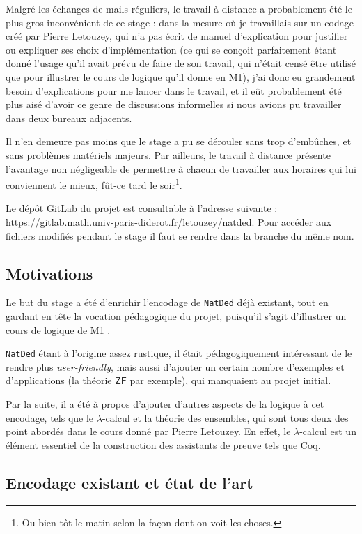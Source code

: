 \documentclass[a4paper]{article}
\newcommand{\ZF}{\mathsf{ZF}}
\theoremstyle{remark}
\theoremstyle{remark}
\theoremstyle{remark}
\theoremstyle{definition}
\theoremstyle{definition}
\theoremstyle{definition}
\begin{document}
Malgré les échanges de mails réguliers, le travail à distance a probablement été le plus gros inconvénient de ce stage : dans la mesure où je travaillais sur un codage créé par Pierre Letouzey, qui n'a pas écrit de manuel d'explication pour justifier ou expliquer ses choix d'implémentation (ce qui se conçoit parfaitement étant donné l'usage qu'il avait prévu de faire de son travail, qui n'était censé être utilisé que pour illustrer le cours de logique qu'il donne en M1), j'ai donc eu grandement besoin d'explications pour me lancer dans le travail, et il eût probablement été plus aisé d'avoir ce genre de discussions informelles si nous avions pu travailler dans deux bureaux adjacents.

Il n'en demeure pas moins que le stage a pu se dérouler sans trop d'embûches, et sans problèmes matériels majeurs. Par ailleurs, le travail à distance présente l'avantage non négligeable de permettre à chacun de travailler aux horaires qui lui conviennent le mieux, fût-ce tard le soir\footnote{Ou bien tôt le matin selon la façon dont on voit les choses.}.

Le dépôt GitLab du projet est consultable à l'adresse suivante : \url{https://gitlab.math.univ-paris-diderot.fr/letouzey/natded}. Pour accéder aux fichiers modifiés pendant le stage il faut se rendre dans la branche du même nom.

\subsection*{Motivations}

Le but du stage a été d'enrichir l'encodage de \verb+NatDed+ déjà existant, tout en gardant en tête la vocation pédagogique du projet, puisqu'il s'agit d'illustrer un cours de logique de M1 \cite{poly}.

\verb+NatDed+ étant à l'origine assez rustique, il était pédagogiquement intéressant de le rendre plus \textit{user-friendly}, mais aussi d'ajouter un certain nombre d'exemples et d'applications (la théorie $\ZF$ par exemple), qui manquaient au projet initial.

Par la suite, il a été à propos d'ajouter d'autres aspects de la logique à cet encodage, tels que le $\lambda$-calcul et la théorie des ensembles, qui sont tous deux des point abordés dans le cours donné par Pierre Letouzey. En effet, le $\lambda$-calcul est un élément essentiel de la construction des assistants de preuve tels que Coq.

\subsection*{Encodage existant et état de l'art}
\end{document}
